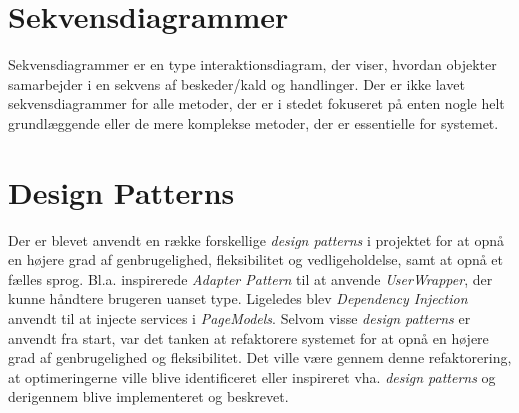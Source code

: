 \section{Sekvensdiagrammer}
\label{sec:sekvens-diagrammer}
Sekvensdiagrammer er en type interaktionsdiagram, der viser, hvordan objekter samarbejder i en sekvens af beskeder/kald og handlinger.
Der er ikke lavet sekvensdiagrammer for alle metoder, der er i stedet fokuseret på enten nogle helt grundlæggende eller de mere komplekse metoder, der er essentielle for systemet.

\section{Design Patterns}
\label{sec:design-patterns}
Der er blevet anvendt en række forskellige \emph{design patterns} i projektet for at opnå en højere grad af genbrugelighed, fleksibilitet og vedligeholdelse, samt at opnå et fælles sprog.
Bl.a. inspirerede \emph{Adapter Pattern} til at anvende \emph{UserWrapper}, der kunne håndtere brugeren uanset type. Ligeledes blev \emph{Dependency Injection} anvendt til at injecte services i \emph{PageModels}.
Selvom visse \emph{design patterns} er anvendt fra start, var det tanken at refaktorere systemet for at opnå en højere grad af genbrugelighed og fleksibilitet.
Det ville være gennem denne refaktorering, at optimeringerne ville blive identificeret eller inspireret vha. \emph{design patterns} og derigennem blive implementeret og beskrevet.

